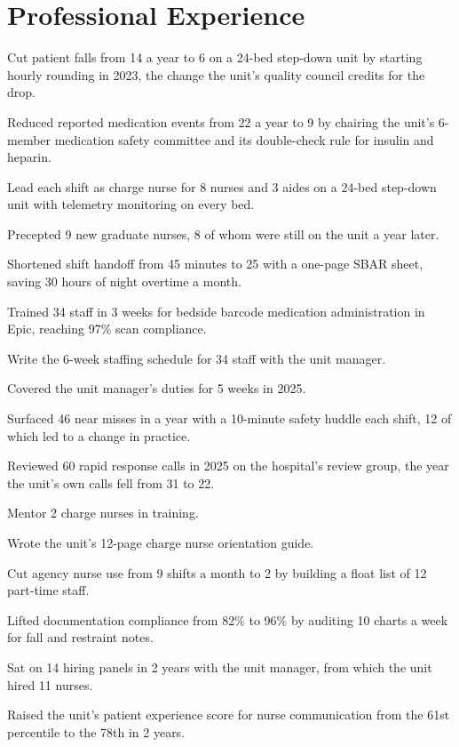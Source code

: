 \documentclass{resume}
\begin{document}
\section{Professional Experience}
\begin{bullets}
  \item Cut patient falls from 14 a year to 6 on a 24-bed step-down unit by starting hourly rounding in 2023, the change the unit's quality council credits for the drop.
  \item Reduced reported medication events from 22 a year to 9 by chairing the unit's 6-member medication safety committee and its double-check rule for insulin and heparin.
  \item Lead each shift as charge nurse for 8 nurses and 3 aides on a 24-bed step-down unit with telemetry monitoring on every bed.
  \item Precepted 9 new graduate nurses, 8 of whom were still on the unit a year later.
  \item Shortened shift handoff from 45 minutes to 25 with a one-page SBAR sheet, saving 30 hours of night overtime a month.
  \item Trained 34 staff in 3 weeks for bedside barcode medication administration in Epic, reaching 97\% scan compliance.
  \item Write the 6-week staffing schedule for 34 staff with the unit manager.
  \item Covered the unit manager's duties for 5 weeks in 2025.
  \item Surfaced 46 near misses in a year with a 10-minute safety huddle each shift, 12 of which led to a change in practice.
  \item Reviewed 60 rapid response calls in 2025 on the hospital's review group, the year the unit's own calls fell from 31 to 22.
  \item Mentor 2 charge nurses in training.
  \item Wrote the unit's 12-page charge nurse orientation guide.
  \item Cut agency nurse use from 9 shifts a month to 2 by building a float list of 12 part-time staff.
  \item Lifted documentation compliance from 82\% to 96\% by auditing 10 charts a week for fall and restraint notes.
  \item Sat on 14 hiring panels in 2 years with the unit manager, from which the unit hired 11 nurses.
  \item Raised the unit's patient experience score for nurse communication from the 61st percentile to the 78th in 2 years.
\end{bullets}
\end{document}
